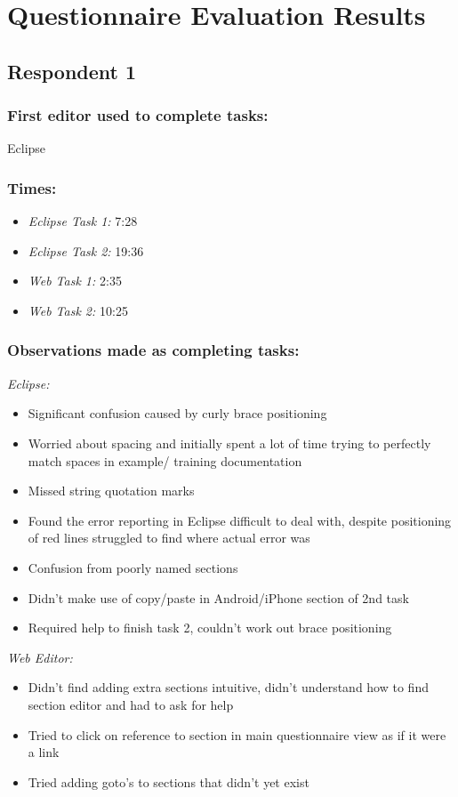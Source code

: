 

\section{Questionnaire Evaluation Results}\label{questionnaireEvalResults}

\subsection{Respondent 1}
\subsubsection*{First editor used to complete tasks:} Eclipse
\subsubsection*{Times:}
\begin{itemize}
\item \emph{Eclipse Task 1:} 7:28
\item \emph{Eclipse Task 2:} 19:36
\item \emph{Web Task 1:} 2:35
\item \emph{Web Task 2:} 10:25
\end{itemize}
\subsubsection*{Observations made as completing tasks:}

\emph{Eclipse:}
\begin{itemize}
\item Significant confusion caused by curly brace positioning
\item Worried about spacing and initially spent a lot of time trying to perfectly match spaces in example/ training documentation
\item Missed string quotation marks
\item Found the error reporting in Eclipse difficult to deal with, despite positioning of red lines struggled to find where actual error was
\item Confusion from poorly named sections
\item Didn't make use of copy/paste in Android/iPhone section of 2nd task
\item Required help to finish task 2, couldn't work out brace positioning
\end{itemize}
\emph{Web Editor:}
\begin{itemize}
\item Didn't find adding extra sections intuitive, didn't understand how to find section editor and had to ask for help
\item Tried to click on reference to section in main questionnaire view as if it were a link
\item Tried adding goto's to sections that didn't yet exist
\end{itemize}

